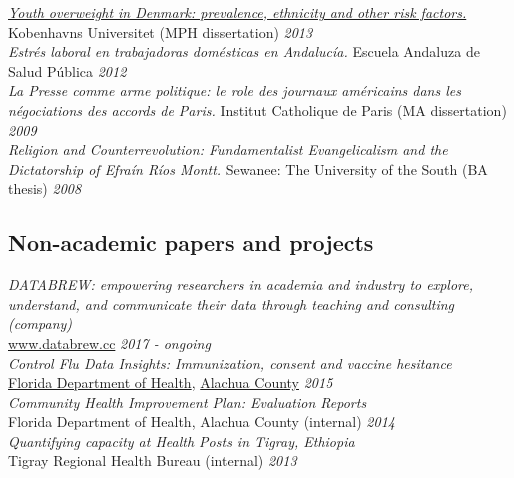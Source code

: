 \documentclass[11pt]{article}
\begin{document}
\noindent \emph{\href{http://info.skolesundhed.dk/wp-content/uploads/2012/10/Speciale-af-Joseph-Brew.pdf}{Youth overweight in Denmark: prevalence, ethnicity and other risk factors.}} Kobenhavns Universitet (MPH dissertation) \hfill \emph{2013}\\

\noindent \emph{Estrés laboral en trabajadoras domésticas en Andalucía. } Escuela Andaluza de Salud Pública  \hfill \emph{2012}\\

\noindent \emph{La Presse comme arme politique: le role des journaux américains dans les négociations des accords de Paris.} Institut Catholique de Paris (MA dissertation) \hfill \emph{2009}\\

\noindent \emph{Religion and Counterrevolution: Fundamentalist Evangelicalism and the Dictatorship of Efraín Ríos Montt.} Sewanee: The University of the South (BA thesis) \hfill \emph{2008}\\

\subsection*{Non-academic papers and projects}

\noindent \emph{DATABREW: empowering researchers in academia and industry to explore, understand,
and communicate their data through teaching and consulting (company)}\\
\href{www.databrew.cc}{www.databrew.cc} \hfill \emph{2017 - ongoing}\\


\noindent \emph{Control Flu Data Insights: Immunization, consent and vaccine hesitance}\\ \href{http://economicsofmalaria.com/pdfs/estimating.pdf}{Florida Department of Health}, \href{http://economicsofmalaria.com/pdfs/targeting.pdf}{Alachua County} \hfill \emph{2015}\\

\noindent \emph{Community Health Improvement Plan: Evaluation Reports} \\ Florida Department of Health, Alachua County (internal) \hfill \emph{2014}\\

\noindent \emph{Quantifying capacity at Health Posts in Tigray, Ethiopia} \\ Tigray Regional Health Bureau (internal) \hfill \emph{2013}\\
\end{document}
